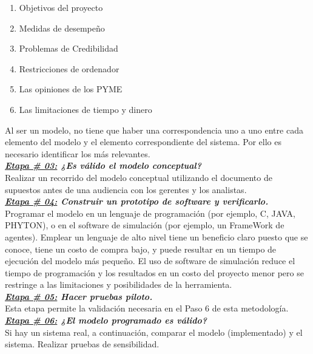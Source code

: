 \begin{enumerate}
    \item Objetivos del proyecto
    \item Medidas de desempeño
    \item Problemas de Credibilidad
    \item Restricciones de ordenador
    \item Las opiniones de los PYME
    \item Las limitaciones de tiempo y dinero
\end{enumerate}

Al ser un modelo, no tiene que haber una correspondencia uno a uno entre cada elemento del modelo y el elemento correspondiente del sistema. Por ello es necesario identificar los más relevantes.\\

\textbf{\textit{\underline{Etapa \# 03:} ¿Es válido el modelo conceptual?}}\\

Realizar un recorrido del modelo conceptual utilizando el documento de supuestos antes de una audiencia con los gerentes y los analistas.\\

\textbf{\textit{\underline{Etapa \# 04:} Construir un prototipo de software y verificarlo.}}\\

Programar el modelo en un lenguaje de programación (por ejemplo, C, JAVA, PHYTON), o en el software de simulación (por ejemplo, un FrameWork de agentes). Emplear un lenguaje de alto nivel tiene un beneficio claro puesto que se conoce, tiene un costo de compra bajo, y puede resultar en un tiempo de ejecución del modelo más pequeño. El uso de software de simulación reduce el tiempo de programación y los resultados en un costo del proyecto menor pero se restringe a las limitaciones y posibilidades de la herramienta.\\

\textbf{\textit{\underline{Etapa \# 05:} Hacer pruebas piloto.}}\\

Esta etapa permite la validación necesaria en el Paso 6 de esta metodología.\\

\textbf{\textit{\underline{Etapa \# 06:} ¿El modelo programado es válido?}}\\

Si hay un sistema real, a continuación, comparar el modelo (implementado) y el sistema. Realizar pruebas de sensibilidad.\\

